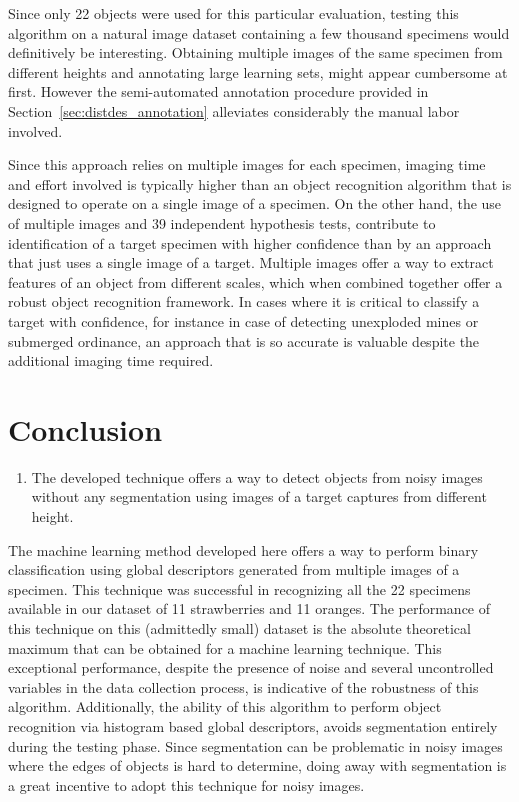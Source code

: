 \documentclass {udthesis}
\begin{document}
Since only 22 objects were used for this particular evaluation, testing this algorithm on a natural image dataset containing a few thousand specimens would definitively be interesting. Obtaining multiple images of the same specimen from different heights and annotating large learning sets, might appear cumbersome at first. However the semi-automated annotation procedure provided in Section~\ref{sec:distdes_annotation} alleviates considerably the manual labor involved.

Since this approach relies on multiple images for each specimen, imaging time and effort involved is typically higher than an object recognition algorithm that is designed to operate on a single image of a specimen. On the other hand, the use of multiple images and 39 independent hypothesis tests, contribute to identification of a target specimen with higher confidence than by an approach that just uses a single image of a target. Multiple images offer a way to extract features of an object from different scales, which when combined together offer a robust object recognition framework. In cases where it is critical to classify a target with confidence, for instance in case of detecting unexploded mines or submerged ordinance, an approach that is so accurate is  valuable despite the additional imaging time required.

\section{Conclusion}
\begin{enumerate}
        \item The developed technique offers a way to detect objects from noisy images without any segmentation using images of a target captures from different height.
\end{enumerate}

The machine learning method developed here offers a way to perform binary classification using global descriptors generated from multiple images of a specimen. This technique was successful in recognizing all the 22 specimens available in our dataset of 11 strawberries and 11 oranges. The performance of this technique on this (admittedly small) dataset is the absolute theoretical maximum that can be obtained for a machine learning technique. This exceptional performance, despite the presence of noise and several uncontrolled variables in the data collection process, is indicative of the robustness of this algorithm. Additionally, the ability of this algorithm to perform object recognition via histogram based global descriptors, avoids segmentation entirely during the testing phase. Since segmentation can be problematic in noisy images where the edges of objects is hard to determine, doing away with segmentation is a great incentive to adopt this technique for noisy images.
\end{document}
